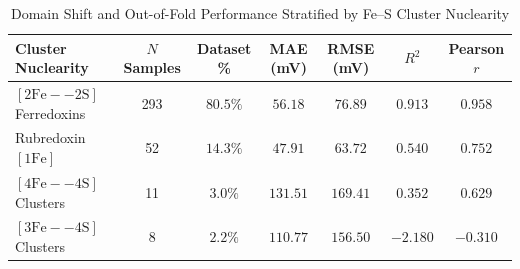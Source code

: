\begin{table}[htbp]
\centering
\caption{Domain Shift and Out-of-Fold Performance Stratified by Fe--S Cluster Nuclearity}
\label{tab:s2_nuclearity}
\small
\begin{tabular*}{\textwidth}{@{\extracolsep{\fill}}lcccccc@{}}
\toprule
Cluster Nuclearity & $N$ Samples & Dataset \% & MAE (mV) & RMSE (mV) & $R^2$ & Pearson $r$ \\
\midrule
$[2\text{Fe}--2\text{S}]$ Ferredoxins & 293 & $80.5\%$ & $56.18$ & $76.89$ & $0.913$ & $0.958$ \\
Rubredoxin $[1\text{Fe}]$ & 52 & $14.3\%$ & $47.91$ & $63.72$ & $0.540$ & $0.752$ \\
$[4\text{Fe}--4\text{S}]$ Clusters & 11 & $3.0\%$ & $131.51$ & $169.41$ & $0.352$ & $0.629$ \\
$[3\text{Fe}--4\text{S}]$ Clusters & 8 & $2.2\%$ & $110.77$ & $156.50$ & $-2.180$ & $-0.310$ \\
\bottomrule
\end{tabular*}
\end{table}
